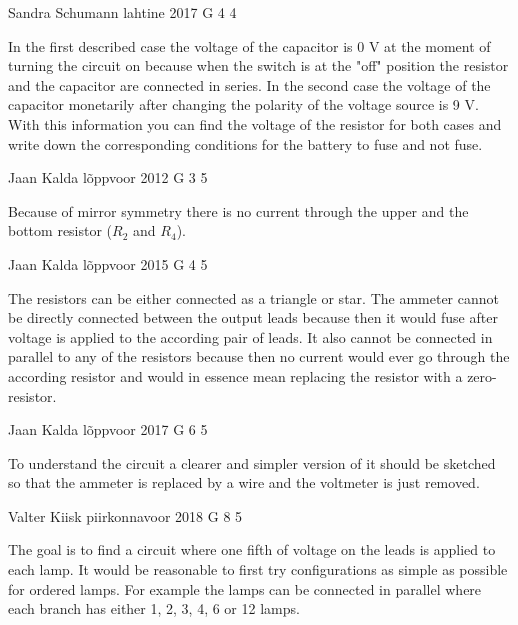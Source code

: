 \documentclass[11pt]{article}
\begin{document}
{Sandra Schumann} %
{lahtine} %
{2017} %
{G 4} %
{4} %
{

\ifEngHint
In the first described case the voltage of the capacitor is 0 V at the moment of turning the circuit on because when the switch is at the "off" position the resistor and the capacitor are connected in series. In the second case the voltage of the capacitor monetarily after changing the polarity of the voltage source is 9 V. With this information you can find the voltage of the resistor for both cases and write down the corresponding conditions for the battery to fuse and not fuse.
\fi
}

{Jaan Kalda} %
{lõppvoor} %
{2012} %
{G 3} %
{5} %
{

\ifEngHint
Because of mirror symmetry there is no current through the upper and the bottom resistor ($R_2$ and $R_4$).
\fi
}

{Jaan Kalda} %
{lõppvoor} %
{2015} %
{G 4} %
{5} %
{

\ifEngHint
The resistors can be either connected as a triangle or star. The ammeter cannot be directly connected between the output leads because then it would fuse after voltage is applied to the according pair of leads. It also cannot be connected in parallel to any of the resistors because then no current would ever go through the according resistor and would in essence mean replacing the resistor with a zero-resistor.
\fi
}

{Jaan Kalda} %
{lõppvoor} %
{2017} %
{G 6} %
{5} %
{

\ifEngHint
To understand the circuit a clearer and simpler version of it should be sketched so that the ammeter is replaced by a wire and the voltmeter is just removed.
\fi
}

{Valter Kiisk} %
{piirkonnavoor} %
{2018} %
{G 8} %
{5} %
{

\ifEngHint
The goal is to find a circuit where one fifth of voltage on the leads is applied to each lamp. It would be reasonable to first try configurations as simple as possible for ordered lamps. For example the lamps can be connected in parallel where each branch has either 1, 2, 3, 4, 6 or 12 lamps.
\fi
}
\end{document}

